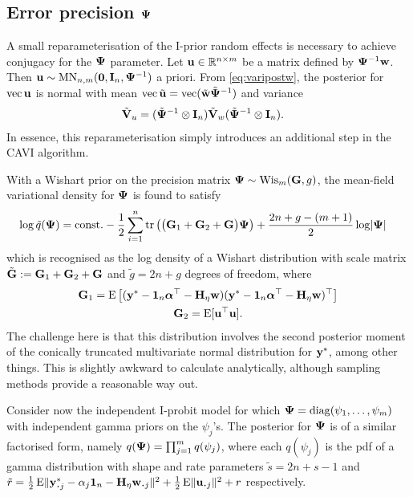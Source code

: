 \subsection{Error precision \texorpdfstring{${\bm\Psi}$}{$\Psi$}}

A small reparameterisation of the I-prior random effects is necessary to achieve conjugacy for the ${\bm\Psi}$ parameter.
Let ${\mathbf u}\in\mathbb{R}^{n\times m}$ be a matrix defined by ${\bm\Psi}^{-1}{\mathbf w}$.
Then ${\mathbf u} \sim \operatorname{MN}_{n,m}({\mathbf 0}, {\mathbf I}_n, {\bm\Psi}^{-1})$ a priori.
From \cref{eq:varipostw}, the posterior for $\operatorname{vec} {\mathbf u}$ is normal with mean $\operatorname{vec} \tilde{{\mathbf u}} = \operatorname{vec} (\tilde{{\mathbf w}}\tilde{{\bm\Psi}}^{-1} )$ and variance
\begin{align*}
  \tilde {{\mathbf V}}_u
  &= (\tilde{{\bm\Psi}}^{-1} \otimes {\mathbf I}_n) \tilde {{\mathbf V}}_w (\tilde{{\bm\Psi}}^{-1} \otimes {\mathbf I}_n). 
\end{align*}
In essence, this reparameterisation simply introduces an additional step in the CAVI algorithm.

With a Wishart prior on the precision matrix ${\bm\Psi}\sim\operatorname{Wis}_m({\mathbf G},g)$, the mean-field variational density for ${\bm\Psi}$ is found to satisfy
\begin{align*}
  \log \tilde q({\bm\Psi})
  &= \text{const.}\hspace{0.01em} - \frac{1}{2} \sum_{i=1}^n \operatorname{tr} \left( 
  \big({\mathbf G}_1 + {\mathbf G}_2 + {\mathbf G} \big){\bm\Psi} 
  \right) + \frac{2n + g - (m+1)}{2} \log \lvert{\bm\Psi}\rvert
\end{align*}
which is recognised as the log density of a Wishart distribution with scale matrix $\tilde{{\mathbf G}} := {\mathbf G}_1 + {\mathbf G}_2 + {\mathbf G}$ and $\tilde g = 2n + g$ degrees of freedom, where
\begin{align}
  \begin{gathered}
  {\mathbf G}_1 = \operatorname{E} \left[ 
  ({\mathbf y}^* - {\mathbf 1}_n{\bm\alpha}^\top - {\mathbf H}_\eta{\mathbf w})
  ({\mathbf y}^* - {\mathbf 1}_n{\bm\alpha}^\top - {\mathbf H}_\eta{\mathbf w})^\top 
  \right]   \\
  {\mathbf G}_2 = \operatorname{E} [{\mathbf u}^\top {\mathbf u} ].
  \end{gathered}
\end{align}
The challenge here is that this distribution involves the second posterior moment of the conically truncated multivariate normal distribution for ${\mathbf y}^*$, among other things. 
This is slightly awkward to calculate analytically, although sampling methods provide a reasonable way out.

Consider now the independent I-probit model for which ${\bm\Psi} = \operatorname{diag}(\psi_1,\dots,\psi_m)$ with independent gamma priors on the $\psi_j$'s.
The posterior for ${\bm\Psi}$ is of a similar factorised form, namely $ q({\bm\Psi}) = \prod_{j=1}^m  q(\psi_j)$, where each $ q(\psi_j)$ is the pdf of a gamma distribution with shape and rate parameters $\tilde s = 2n+s-1$ and $\tilde r = \half \E\norm{\by_{\bigcdot j}^* - \alpha_j\bone_n - \bH_\eta\bw_{\bigcdot j}}^2 + \half \E\norm{\bu_{\bigcdot j}}^2  + r$ respectively.

